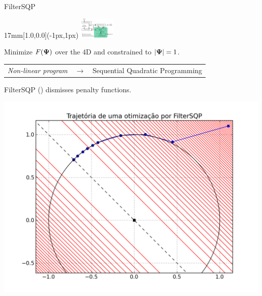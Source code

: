 \begin{frame}{FilterSQP}
  \begin{textblock*}{17mm}[1.0,0.0](\paperwidth-1px,1px)
    \includegraphics[width=17mm]{blocos_s4.png}
  \end{textblock*}
  Minimize $F({\boldsymbol{\Psi}})$ over the 4D and constrained to $|{\boldsymbol{\Psi}}|=1$.

  \begin{tabular}{rcl}
    {\em Non-linear program} & $\rightarrow$ & \parbox{12em}{ Sequential Quadratic Programming}
  \end{tabular}
  
  FilterSQP (\cite{Fletcher2002}) dismisses penalty functions.
  \centerline{
    \includegraphics[height=9\baselineskip]{sqp_traj.png}
  }
\end{frame}

